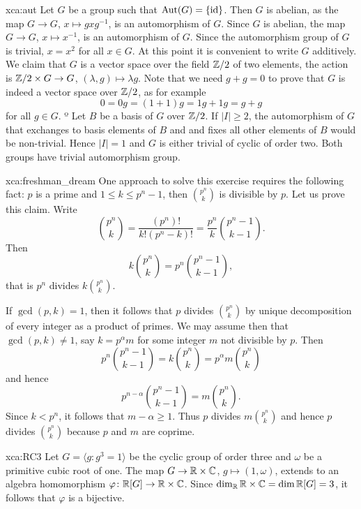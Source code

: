 \begin{sol}{xca:aut}
    Let $G$ be a group such that $\operatorname{Aut}(G)=\{\operatorname{id}\}$. 
    Then $G$ is abelian, as the map $G\to G$, $x\mapsto gxg^{-1}$,   
    is an automorphism of $G$. Since $G$ is abelian, 
    the map $G\to G$, $x\mapsto x^{-1}$, is an automorphism of $G$. Since 
    the automorphism group of $G$ is trivial, 
    $x=x^2$ for all $x\in G$. 
    At this point it is convenient to write $G$ additively. We claim that 
    $G$ is a vector space
    over the field $\mathbb{Z}/2$ of two elements, the action
    is $\mathbb{Z}/2\times G\to G$, $(\lambda,g)\mapsto \lambda g$. Note that
    we need $g+g=0$ to prove that $G$ is indeed a vector space over $\mathbb{Z}/2$, as for example
    \[
    0=0g=(1+1)g=1g+1g=g+g
    \]
    for all $g\in G$. º
    Let $B$ be   
    a basis of $G$ over $\mathbb{Z}/2$. If $|I|\geq 2$, 
    the automorphism of $G$ that exchanges to basis elements of $B$ and  
    and fixes all other elements of $B$ would be non-trivial. Hence $|I|=1$ and 
    $G$ is either trivial of cyclic of order two. Both groups have trivial
    automorphism group. 
\end{sol}


\begin{sol}{xca:freshman_dream}
    One approach to solve this exercise requires the following fact: 
    $p$ is a prime and $1\leq k\leq p^n-1$, then $\binom{p^n}{k}$ is divisible by $p$.
    Let us prove this claim. Write
    \[
    \binom{p^n}{k}=\frac{(p^n)!}{k!(p^n-k)!}=\frac{p^n}{k}\binom{p^n-1}{k-1}.
    \]
    Then
    \[
    k\binom{p^n}{k}=p^n\binom{p^n-1}{k-1},
    \]
    that is $p^n$ divides $k\binom{p^n}{k}$. 
    
    If $\gcd(p,k)=1$, then it follows that $p$ divides $\binom{p^n}{k}$ by unique decomposition
    of every integer as a product of primes. We may assume then that $\gcd(p,k)\ne1$, 
    say $k=p^\alpha m$ for some integer $m$ not divisible by $p$. Then
    \[
    p^n\binom{p^n-1}{k-1}=k\binom{p^n}{k}=p^{\alpha}m\binom{p^n}{k}
    \]
    and hence 
    \[
    p^{n-\alpha}\binom{p^n-1}{k-1}=m\binom{p^n}{k}.
    \]
    Since $k<p^n$, it follows that
    $m-\alpha\geq 1$. Thus $p$ divides $m\binom{p^n}{k}$ and hence
    $p$ divides $\binom{p^n}{k}$ because $p$ and $m$ are coprime. 
\end{sol}


\begin{sol}{xca:RC3}
Let $G=\langle g:g^3=1\rangle$ be the cyclic group of order three and $\omega$ be a primitive cubic root of one.  
The map $G\to \mathbb{R}\times\mathbb{C}$, $g\mapsto (1,\omega)$, extends to an algebra
homomorphism $\varphi\colon\mathbb{R}[G]\to\mathbb{R}\times\mathbb{C}$. Since 
$\dim_{\mathbb{R}}\mathbb{R}\times\mathbb{C}=\dim\mathbb{R}[G]=3$, it follows that $\varphi$ is a bijective. 
\end{sol}

